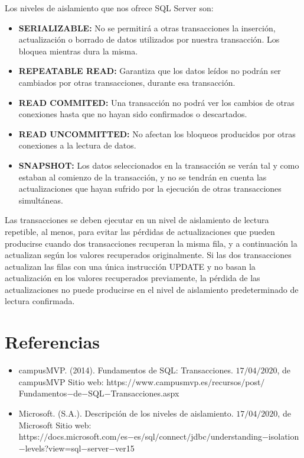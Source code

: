 \documentclass[spanish]{article}
\begin{document}
 Los niveles de aislamiento que nos ofrece SQL Server son:
\begin{itemize}
    \item \textbf{SERIALIZABLE:} No se permitirá a otras transacciones la inserción, actualización o borrado de datos utilizados por nuestra transacción. Los bloquea mientras dura la misma.
    \item \textbf{REPEATABLE READ:} Garantiza que los datos leídos no podrán ser cambiados por otras transacciones, durante esa transacción.
    \item \textbf{READ COMMITED:} Una transacción no podrá ver los cambios de otras conexiones hasta que no hayan sido confirmados o descartados.
    \item \textbf{READ UNCOMMITTED:} No afectan los bloqueos producidos por otras conexiones a la lectura de datos.
    \item \textbf{SNAPSHOT:} Los datos seleccionados en la transacción se verán tal y como estaban al comienzo de la transacción, y no se tendrán en cuenta las actualizaciones que hayan sufrido por la ejecución de otras transacciones simultáneas.
\end{itemize}
Las transacciones se deben ejecutar en un nivel de aislamiento de lectura repetible, al menos, para evitar las pérdidas de actualizaciones que pueden producirse cuando dos transacciones recuperan la misma fila, y a continuación la actualizan según los valores recuperados originalmente. Si las dos transacciones actualizan las filas con una única instrucción UPDATE y no basan la actualización en los valores recuperados previamente, la pérdida de las actualizaciones no puede producirse en el nivel de aislamiento predeterminado de lectura confirmada.

\section{Referencias}
\begin{itemize}
    \item campusMVP. (2014). Fundamentos de SQL: Transacciones. $17/04/2020$, de campusMVP Sitio web: https:$//$www.campusmvp.es$/$recursos$/$post$/$Fundamentos$-$de$-$SQL$-$Transacciones.aspx
    \item Microsoft. (S.A.). Descripción de los niveles de aislamiento. $17/04/2020$, de Microsoft Sitio web:\\ https:$//$docs.microsoft.com$/$es$-$es$/$sql$/$connect$/$jdbc$/$understanding$-$isolation$-$levels?view=sql$-$server$-$ver15
\end{itemize}
\end{document}
